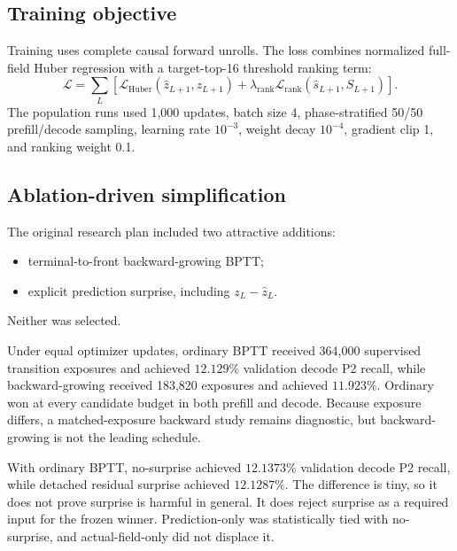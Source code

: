 \documentclass[11pt]{article}
\begin{document}
\subsection{Training objective}

Training uses complete causal forward unrolls. The loss combines normalized full-field Huber regression with a target-top-16 threshold ranking term:
\begin{equation}
\mathcal{L}=\sum_L \left[
\mathcal{L}_{\mathrm{Huber}}(\hat z_{L+1},z_{L+1})
+\lambda_{\mathrm{rank}}\mathcal{L}_{\mathrm{rank}}(\hat s_{L+1},S_{L+1})
\right].
\end{equation}
The population runs used 1,000 updates, batch size 4, phase-stratified 50/50 prefill/decode sampling, learning rate $10^{-3}$, weight decay $10^{-4}$, gradient clip 1, and ranking weight 0.1.

\subsection{Ablation-driven simplification}

The original research plan included two attractive additions:
\begin{itemize}
  \item terminal-to-front backward-growing BPTT;
  \item explicit prediction surprise, including $z_L-\hat z_L$.
\end{itemize}
Neither was selected.

Under equal optimizer updates, ordinary BPTT received 364,000 supervised transition exposures and achieved $12.129\%$ validation decode P2 recall, while backward-growing received 183,820 exposures and achieved $11.923\%$. Ordinary won at every candidate budget in both prefill and decode. Because exposure differs, a matched-exposure backward study remains diagnostic, but backward-growing is not the leading schedule.

With ordinary BPTT, no-surprise achieved $12.1373\%$ validation decode P2 recall, while detached residual surprise achieved $12.1287\%$. The difference is tiny, so it does not prove surprise is harmful in general. It does reject surprise as a required input for the frozen winner. Prediction-only was statistically tied with no-surprise, and actual-field-only did not displace it.
\end{document}
